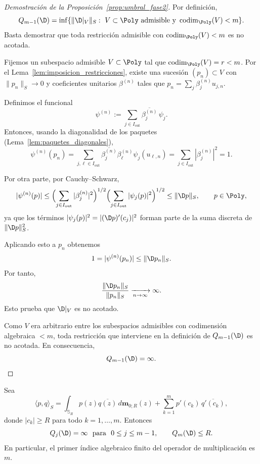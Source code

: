 \begin{proof}[Demostración de la Proposición~\ref{prop:umbral_fase2}]
	Por definición,
	\[
		Q_{m-1}(\D)
		=
		\inf\{\|\D|_V\|_S:\ V\subset\Poly\ \text{admisible y}\ \operatorname{codim}_{\Poly}(V)<m\}.
	\]
	Basta demostrar que toda restricción admisible con
	$\operatorname{codim}_{\Poly}(V)<m$ es no acotada.

	Fijemos un subespacio admisible $V\subset \Poly$ tal que
	$\operatorname{codim}_{\Poly}(V)=r<m$.
	Por el Lema~\ref{lem:imposicion_restricciones}, existe una sucesión $(p_n)\subset V$
	con $\|p_n\|_S\to0$ y coeficientes unitarios $\beta^{(n)}$ tales que
	$p_n=\sum_j \beta_j^{(n)}u_{j,n}$.

	Definimos el funcional
	\[
		\psi^{(n)}:=\sum_{j\in I_{\mathrm{out}}}\overline{\beta_j^{(n)}}\,\psi_j.
	\]
	Entonces, usando la diagonalidad de los paquetes (Lema~\ref{lem:paquetes_diagonales}),
	\[
		\psi^{(n)}(p_n)
		=
		\sum_{j,\ell\in I_{\mathrm{out}}}
		\overline{\beta_j^{(n)}}\beta_\ell^{(n)}\psi_j(u_{\ell,n})
		=
		\sum_{j\in I_{\mathrm{out}}}|\beta_j^{(n)}|^2
		=1.
	\]

	Por otra parte, por Cauchy--Schwarz,
	\[
		|\psi^{(n)}(p)|
		\le
		\Bigl(\sum_{j\in I_{\mathrm{out}}}|\beta_j^{(n)}|^2\Bigr)^{1/2}
		\Bigl(\sum_{j\in I_{\mathrm{out}}}|\psi_j(p)|^2\Bigr)^{1/2}
		\le
		\|\D p\|_S,
		\qquad p\in\Poly,
	\]
	ya que los términos $|\psi_j(p)|^2=|(\D p)'(c_j)|^2$ forman parte de la suma discreta
	de $\|\D p\|_S^2$.

	Aplicando esto a $p_n$ obtenemos
	\[
		1=|\psi^{(n)}(p_n)|\le \|\D p_n\|_S.
	\]
	Por tanto,
	\[
		\frac{\|\D p_n\|_S}{\|p_n\|_S}\xrightarrow[n\to\infty]{}\infty.
	\]
	Esto prueba que $\D|_V$ es no acotado.

	Como $V$ era arbitrario entre los subespacios admisibles con codimensión algebraica
	$<m$, toda restricción que interviene en la definición de $Q_{m-1}(\D)$ es no
	acotada. En consecuencia,
	\[
		Q_{m-1}(\D)=\infty.
	\]
\end{proof}

\begin{thm}
	\label{thm:umbral_puramente_exterior}
	Sea
	\[
		\langle p,q\rangle_S
		=
		\int_{\mathbb{S}_R} p(z)\overline{q(z)}\,d\mathbf{m}_{0;R}(z)
		+
		\sum_{k=1}^{m} p'(c_k)\,\overline{q'(c_k)},
	\]
	donde $|c_k|\ge R$ para todo $k=1,\dots,m$. Entonces
	\[
		Q_j(\D)=\infty\ \text{ para }\ 0\le j\le m-1,
		\qquad
		Q_m(\D)\le R.
	\]
	En particular, el primer índice algebraico finito del operador de multiplicación es $m$.
\end{thm}

